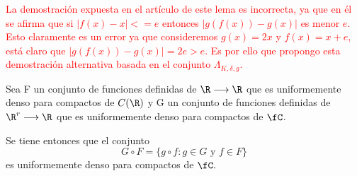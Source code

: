 \textcolor{red}{La demostración expuesta en el artículo de este lema es incorrecta, ya que en él se afirma que 
si $|f(x) - x| <= e$ entonces $|g(f(x))- g(x)|$ es menor $e$. Esto claramente es un error ya que 
consideremos $g(x) = 2x$ y $f(x)=x+e$, está claro que $|g(f(x))- g(x)|=2e>e$. Es por ello que propongo esta
demostración alternativa basada en el conjunto $\Lambda_{K, \delta, g}$.}
\begin{lema}\label{lema:lema_a_6}
    Sea F un conjunto de funciones definidas de $\R \longrightarrow \R$ que es uniformemente 
    denso para compactos de $C(\R)$ y
    G un conjunto de funciones definidas de $\R^r \longrightarrow \R$ que es uniformemente 
    denso para compactos de $\fC$.
    
    Se tiene entonces que el conjunto 
    \begin{equation}
        G \circ F 
        = 
        \{
            g \circ f : g \in G \text{ y } f \in F
        \}
    \end{equation}
    es uniformemente denso para compactos de $\fC.$
\end{lema}
